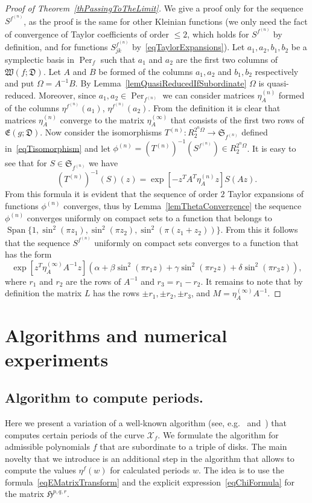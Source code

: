 \documentclass{amsart}
\numberwithin{equation}{section}
\theoremstyle{definition}
\theoremstyle{remark}
\DeclareMathOperator{\Span}{Span}
\DeclareMathOperator{\Per}{Per}
\begin{document}
	\begin{proof}[Proof of Theorem~\ref{thPassingToTheLimit}]
		We give a proof only for the sequence $S^{f^{(n)}}$, as the proof is the same for other Kleinian functions (we only need the fact of convergence of Taylor coefficients of order $\le 2$, which holds for $S^{f^{(n)}}$ by definition, and for functions $S_{jk}^{f^{(n)}}$ by~\eqref{eqTaylorExpansions}). Let $a_1,a_2,b_1,b_2$ be a symplectic basis in $\Per_f$ such that $a_1$ and $a_2$ are the first two columns of $\mathfrak W(f;\mathfrak D)$. Let $A$ and $B$ be formed of the columns $a_1,a_2$ and $b_1,b_2$ respectively and put $\Omega = A^{-1}B$. By Lemma~\ref{lemQuasiReducedIfSubordinate} $\Omega$ is quasi-reduced. Moreover, since $a_1,a_2 \in \Per_{f^{(n)}}$ we can consider matrices $\eta_A^{(n)}$ formed of the columns $\eta^{f^{(n)}}(a_1)$, $\eta^{f^{(n)}}(a_2)$. From the definition it is clear that matrices $\eta_A^{(n)}$ converge to the matrix $\eta^{(\infty)}_A$ that consists of the first two rows of $\mathfrak E(g;\mathfrak D)$. Now consider the isomorphisms $T^{(n)}:R_2^{2^n\Omega} \to \mathfrak S_{f^{(n)}}$ defined in~\eqref{eqTisomorphism} and let $\phi^{(n)} = \left(T^{(n)}\right)^{-1}\left(S^{f^{(n)}}\right) \in R_2^{2^n\Omega}$. It is easy to see that for $S \in \mathfrak S_{f^{(n)}}$ we have
		\[
		\left(T^{(n)}\right)^{-1}\left(S\right)(z) = \exp\left[-z^TA^T\eta^{(n)}_Az\right]S(Az).
		\]
		From this formula it is evident that the sequence of order $2$ Taylor expansions of functions $\phi^{(n)}$ converges, thus by Lemma~\ref{lemThetaConvergence} the sequence $\phi^{(n)}$ converges uniformly on compact sets to a function that belongs to $\Span\{1, \sin^2(\pi z_1), \sin^2(\pi z_2), \sin^2(\pi (z_1 + z_2))\}$. From this it follows that the sequence $S^{f^{(n)}}$ uniformly on compact sets converges to a function that has the form
		\[
		\exp[z^T\eta_A^{(\infty)}A^{-1}z](\alpha + \beta \sin^2(\pi r_1z) + \gamma \sin^2(\pi r_2 z) + \delta \sin^2(\pi r_3z)),
		\]
		where $r_1$ and $r_2$ are the rows of $A^{-1}$ and $r_3 = r_1 - r_2$. It remains to note that by definition the matrix $L$ has the rows $\pm r_1,\pm r_2,\pm r_3$, and $M = \eta_A^{(\infty)}A^{-1}$.
	\end{proof}
	
	\section{Algorithms and numerical experiments}\label{sec:Algo}
	
	\subsection{Algorithm to compute periods.} Here we present a variation of a well-known algorithm (see, e.g.~\cite{BostMestre} and~\cite{Chow}) that computes certain periods of the curve $\mathcal X_f$. We formulate the algorithm for admissible polynomials $f$ that are subordinate to a triple of disks. The main novelty that we introduce is an additional step in the algorithm that allows to compute the values $\eta^f(w)$ for calculated periods $w$. The idea is to use the formula~\eqref{eqEMatrixTransform} and the explicit expression~\eqref{eqChiFormula} for the matrix $\mathfrak H^{p,q,r}$. 
	
\end{document}
